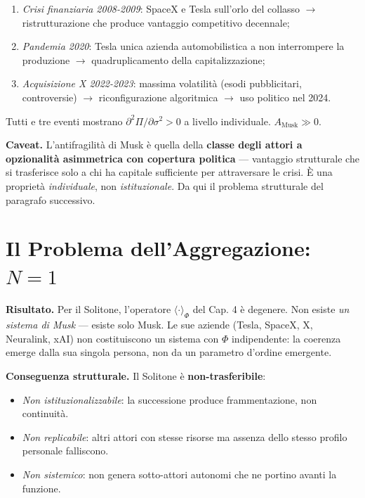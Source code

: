 \begin{enumerate}
\def\labelenumi{\arabic{enumi}.}
\tightlist
\item
  \emph{Crisi finanziaria 2008-2009}: SpaceX e Tesla sull'orlo del
  collasso $\to$ ristrutturazione che produce vantaggio competitivo
  decennale;
\item
  \emph{Pandemia 2020}: Tesla unica azienda automobilistica a non
  interrompere la produzione $\to$ quadruplicamento della capitalizzazione;
\item
  \emph{Acquisizione X 2022-2023}: massima volatilità (esodi
  pubblicitari, controversie) $\to$ riconfigurazione algoritmica $\to$ uso
  politico nel 2024.
\end{enumerate}

\Proved{} Tutti e tre eventi mostrano
\(\partial^2 \Pi / \partial \sigma^2 > 0\) a livello individuale.
\(A_{\text{Musk}} \gg 0\).

\Conj{} \textbf{Caveat.} L'antifragilità di Musk è quella della
\textbf{classe degli attori a opzionalità asimmetrica con copertura
politica} --- vantaggio strutturale che si trasferisce solo a chi ha
capitale sufficiente per attraversare le crisi. È una proprietà
\emph{individuale}, non \emph{istituzionale}. Da qui il problema
strutturale del paragrafo successivo.



\section{\texorpdfstring{Il Problema dell'Aggregazione:
\(N = 1\)}{Il Problema dell'Aggregazione: N = 1}}\label{il-problema-dellaggregazione-n-1}

\Proved{} \textbf{Risultato.} Per il Solitone, l'operatore
\(\langle\cdot\rangle_\Phi\) del Cap. 4 è degenere. Non esiste \emph{un
sistema di Musk} --- esiste solo Musk. Le sue aziende (Tesla, SpaceX, X,
Neuralink, xAI) non costituiscono un sistema con \(\Phi\) indipendente:
la coerenza emerge dalla sua singola persona, non da un parametro
d'ordine emergente.

\Hypoth{} \textbf{Conseguenza strutturale.} Il Solitone è
\textbf{non-trasferibile}:

\begin{itemize}
\tightlist
\item
  \emph{Non istituzionalizzabile}: la successione produce
  frammentazione, non continuità.
\item
  \emph{Non replicabile}: altri attori con stesse risorse ma assenza
  dello stesso profilo personale falliscono.
\item
  \emph{Non sistemico}: non genera sotto-attori autonomi che ne portino
  avanti la funzione.
\end{itemize}


